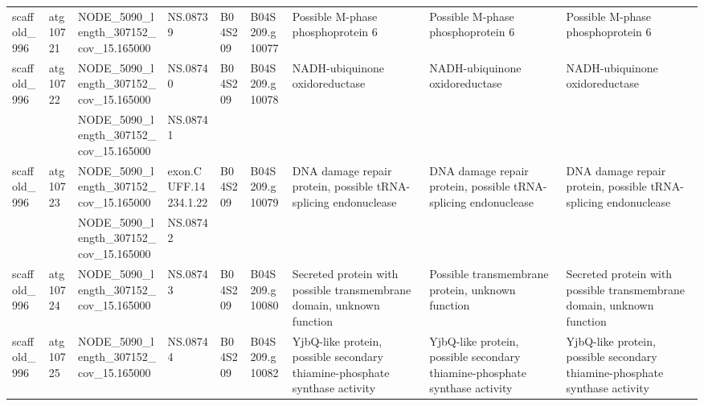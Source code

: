 \begin{longtable}{lllllllll}
   scaffold\_996 &  atg10721 &   NODE\_5090\_length\_307152\_cov\_15.165000 &              NS.08739 &      B04S209 &  B04S209.g10077 &                                               Possible M-phase phosphoprotein 6 &                                               Possible M-phase phosphoprotein 6 &                                               Possible M-phase phosphoprotein 6 \\
   scaffold\_996 &  atg10722 &   NODE\_5090\_length\_307152\_cov\_15.165000 &              NS.08740 &      B04S209 &  B04S209.g10078 &                                                  NADH-ubiquinone oxidoreductase &                                                  NADH-ubiquinone oxidoreductase &                                                  NADH-ubiquinone oxidoreductase \\
                &           &   NODE\_5090\_length\_307152\_cov\_15.165000 &              NS.08741 &              &                 &                                                                                 &                                                                                 &                                                                                 \\
   scaffold\_996 &  atg10723 &   NODE\_5090\_length\_307152\_cov\_15.165000 &  exon.CUFF.14234.1.22 &      B04S209 &  B04S209.g10079 &                  DNA damage repair protein, possible tRNA-splicing endonuclease &                  DNA damage repair protein, possible tRNA-splicing endonuclease &                  DNA damage repair protein, possible tRNA-splicing endonuclease \\
                &           &   NODE\_5090\_length\_307152\_cov\_15.165000 &              NS.08742 &              &                 &                                                                                 &                                                                                 &                                                                                 \\
   scaffold\_996 &  atg10724 &   NODE\_5090\_length\_307152\_cov\_15.165000 &              NS.08743 &      B04S209 &  B04S209.g10080 &           Secreted protein with possible transmembrane domain, unknown function &                                Possible transmembrane protein, unknown function &           Secreted protein with possible transmembrane domain, unknown function \\
   scaffold\_996 &  atg10725 &   NODE\_5090\_length\_307152\_cov\_15.165000 &              NS.08744 &      B04S209 &  B04S209.g10082 &      YjbQ-like protein, possible secondary thiamine-phosphate synthase activity &      YjbQ-like protein, possible secondary thiamine-phosphate synthase activity &      YjbQ-like protein, possible secondary thiamine-phosphate synthase activity \\

\end{longtable}
